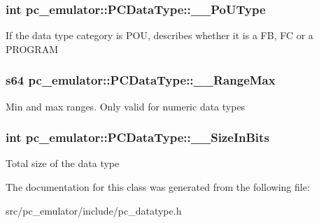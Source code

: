 \subsubsection[{\texorpdfstring{\+\_\+\+\_\+\+Po\+U\+Type}{__PoUType}}]{\setlength{\rightskip}{0pt plus 5cm}int pc\+\_\+emulator\+::\+P\+C\+Data\+Type\+::\+\_\+\+\_\+\+Po\+U\+Type}\hypertarget{classpc__emulator_1_1PCDataType_ac2d244cddd2a30b343aae3af6f291736}{}\label{classpc__emulator_1_1PCDataType_ac2d244cddd2a30b343aae3af6f291736}
If the data type category is P\+OU, describes whether it is a FB, FC or a P\+R\+O\+G\+R\+AM 
\subsubsection[{\texorpdfstring{\+\_\+\+\_\+\+Range\+Max}{__RangeMax}}]{\setlength{\rightskip}{0pt plus 5cm}s64 pc\+\_\+emulator\+::\+P\+C\+Data\+Type\+::\+\_\+\+\_\+\+Range\+Max}\hypertarget{classpc__emulator_1_1PCDataType_a8b4ce729396059f7fe634a5f35f9a2ca}{}\label{classpc__emulator_1_1PCDataType_a8b4ce729396059f7fe634a5f35f9a2ca}
Min and max ranges. Only valid for numeric data types 
\subsubsection[{\texorpdfstring{\+\_\+\+\_\+\+Size\+In\+Bits}{__SizeInBits}}]{\setlength{\rightskip}{0pt plus 5cm}int pc\+\_\+emulator\+::\+P\+C\+Data\+Type\+::\+\_\+\+\_\+\+Size\+In\+Bits}\hypertarget{classpc__emulator_1_1PCDataType_a7556d336d3903549f2be43aa5d28763d}{}\label{classpc__emulator_1_1PCDataType_a7556d336d3903549f2be43aa5d28763d}
Total size of the data type 

The documentation for this class was generated from the following file\+:\begin{DoxyCompactItemize}
\item 
src/pc\+\_\+emulator/include/pc\+\_\+datatype.\+h\end{DoxyCompactItemize}
